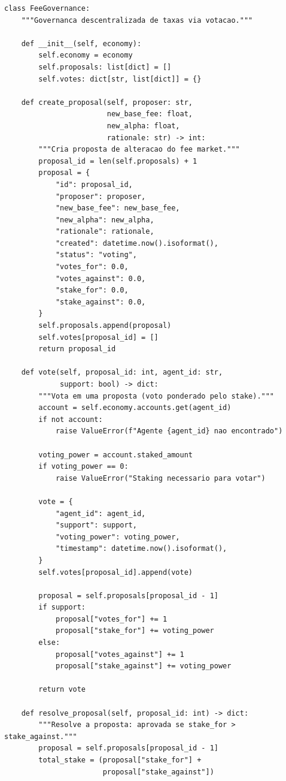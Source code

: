 \begin{lstlisting}[caption={Governanca descentralizada de taxas},
                  label={lst:governanca-taxas}]
class FeeGovernance:
    """Governanca descentralizada de taxas via votacao."""

    def __init__(self, economy):
        self.economy = economy
        self.proposals: list[dict] = []
        self.votes: dict[str, list[dict]] = {}

    def create_proposal(self, proposer: str,
                        new_base_fee: float,
                        new_alpha: float,
                        rationale: str) -> int:
        """Cria proposta de alteracao do fee market."""
        proposal_id = len(self.proposals) + 1
        proposal = {
            "id": proposal_id,
            "proposer": proposer,
            "new_base_fee": new_base_fee,
            "new_alpha": new_alpha,
            "rationale": rationale,
            "created": datetime.now().isoformat(),
            "status": "voting",
            "votes_for": 0.0,
            "votes_against": 0.0,
            "stake_for": 0.0,
            "stake_against": 0.0,
        }
        self.proposals.append(proposal)
        self.votes[proposal_id] = []
        return proposal_id

    def vote(self, proposal_id: int, agent_id: str,
             support: bool) -> dict:
        """Vota em uma proposta (voto ponderado pelo stake)."""
        account = self.economy.accounts.get(agent_id)
        if not account:
            raise ValueError(f"Agente {agent_id} nao encontrado")

        voting_power = account.staked_amount
        if voting_power == 0:
            raise ValueError("Staking necessario para votar")

        vote = {
            "agent_id": agent_id,
            "support": support,
            "voting_power": voting_power,
            "timestamp": datetime.now().isoformat(),
        }
        self.votes[proposal_id].append(vote)

        proposal = self.proposals[proposal_id - 1]
        if support:
            proposal["votes_for"] += 1
            proposal["stake_for"] += voting_power
        else:
            proposal["votes_against"] += 1
            proposal["stake_against"] += voting_power

        return vote

    def resolve_proposal(self, proposal_id: int) -> dict:
        """Resolve a proposta: aprovada se stake_for > stake_against."""
        proposal = self.proposals[proposal_id - 1]
        total_stake = (proposal["stake_for"] +
                       proposal["stake_against"])


\end{lstlisting}
